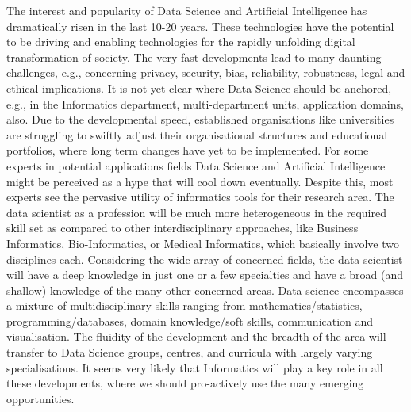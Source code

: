 The interest and popularity of Data Science and Artificial Intelligence has dramatically risen in the last 10-20 years. These technologies have the potential to be driving and enabling technologies for the rapidly unfolding digital transformation of society. The very fast developments lead to many daunting challenges, e.g., concerning privacy, security, bias, reliability, robustness, legal and ethical implications. It is not yet clear where Data Science should be anchored, e.g., in the Informatics department, multi-department units, application domains, also. Due to the developmental speed, established organisations like universities are struggling to swiftly adjust their organisational structures and educational portfolios, where long term changes have yet to be implemented. For some experts in potential applications fields Data Science and Artificial Intelligence might be perceived as a hype that will cool down eventually. Despite this, most experts see the pervasive utility of informatics tools for their research area. The data scientist as a profession will be much more heterogeneous in the required skill set as compared to other interdisciplinary approaches, like Business Informatics, Bio-Informatics, or Medical Informatics, which basically involve two disciplines each. Considering the wide array of concerned fields, the data scientist will have a deep knowledge in just one or a few specialties and have a broad (and shallow) knowledge of the many other concerned areas. Data science encompasses a mixture of multidisciplinary skills ranging from mathematics/statistics, programming/databases, domain knowledge/soft skills, communication and visualisation. The fluidity of the development and the breadth of the area will transfer to Data Science groups, centres, and curricula with largely varying specialisations. It seems very likely that Informatics will play a key role in all these developments, where we should pro-actively use the many emerging opportunities.
